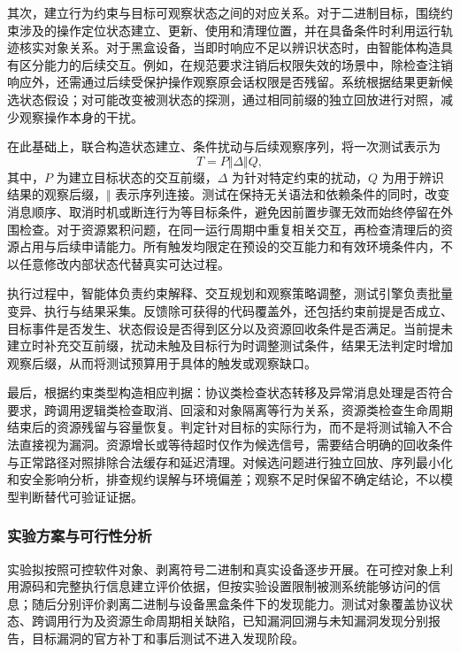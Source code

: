 其次，建立行为约束与目标可观察状态之间的对应关系。对于二进制目标，围绕约束涉及的操作定位状态建立、更新、使用和清理位置，并在具备条件时利用运行轨迹核实对象关系。对于黑盒设备，当即时响应不足以辨识状态时，由智能体构造具有区分能力的后续交互。例如，在规范要求注销后权限失效的场景中，除检查注销响应外，还需通过后续受保护操作观察原会话权限是否残留。系统根据结果更新候选状态假设；对可能改变被测状态的探测，通过相同前缀的独立回放进行对照，减少观察操作本身的干扰。

在此基础上，联合构造状态建立、条件扰动与后续观察序列，将一次测试表示为
\begin{equation}
    T = P \Vert \Delta \Vert Q,
    \label{eq:discovery-test-sequence}
\end{equation}
其中，$P$ 为建立目标状态的交互前缀，$\Delta$ 为针对特定约束的扰动，$Q$ 为用于辨识结果的观察后缀，$\Vert$ 表示序列连接。测试在保持无关语法和依赖条件的同时，改变消息顺序、取消时机或断连行为等目标条件，避免因前置步骤无效而始终停留在外围检查。对于资源累积问题，在同一运行周期中重复相关交互，再检查清理后的资源占用与后续申请能力。所有触发均限定在预设的交互能力和有效环境条件内，不以任意修改内部状态代替真实可达过程。

执行过程中，智能体负责约束解释、交互规划和观察策略调整，测试引擎负责批量变异、执行与结果采集。反馈除可获得的代码覆盖外，还包括约束前提是否成立、目标事件是否发生、状态假设是否得到区分以及资源回收条件是否满足。当前提未建立时补充交互前缀，扰动未触及目标行为时调整测试条件，结果无法判定时增加观察后缀，从而将测试预算用于具体的触发或观察缺口。

最后，根据约束类型构造相应判据：协议类检查状态转移及异常消息处理是否符合要求，跨调用逻辑类检查取消、回滚和对象隔离等行为关系，资源类检查生命周期结束后的资源残留与容量恢复。判定针对目标的实际行为，而不是将测试输入不合法直接视为漏洞。资源增长或等待超时仅作为候选信号，需要结合明确的回收条件与正常路径对照排除合法缓存和延迟清理。对候选问题进行独立回放、序列最小化和安全影响分析，排查规约误解与环境偏差；观察不足时保留不确定结论，不以模型判断替代可验证证据。

\subsubsection{实验方案与可行性分析}
\label{sec:discovery-evaluation}

实验拟按照可控软件对象、剥离符号二进制和真实设备逐步开展。在可控对象上利用源码和完整执行信息建立评价依据，但按实验设置限制被测系统能够访问的信息；随后分别评价剥离二进制与设备黑盒条件下的发现能力。测试对象覆盖协议状态、跨调用行为及资源生命周期相关缺陷，已知漏洞回溯与未知漏洞发现分别报告，目标漏洞的官方补丁和事后测试不进入发现阶段。

